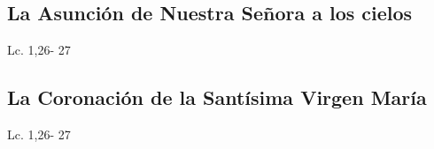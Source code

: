 \documentclass[a4paper,11pt,sans]{article}
\begin{document}
    \subsection*{\hfil La Asunción de Nuestra Señora a los cielos \hfil}
      \begin{multicols}{2}

      \columnbreak
                           
      \end{multicols}         
      \begin{center}
        Lc. 1,26- 27           
      \end{center}
    \subsection*{\hfil La Coronación de la Santísima Virgen María \hfil}
      \begin{multicols}{2}

      \columnbreak
                           
      \end{multicols}         
      \begin{center}
        Lc. 1,26- 27           
      \end{center}
\end{document}
